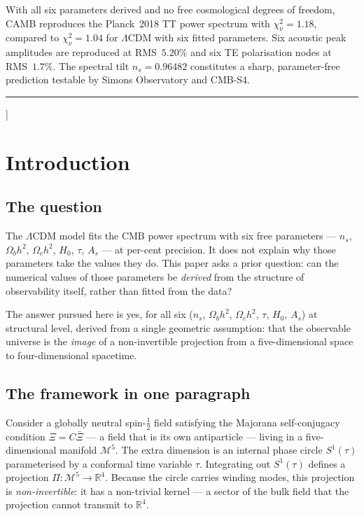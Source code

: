 \documentclass[twocolumn,10pt]{article}
\begin{document}
{With all six parameters derived and no free cosmological degrees of
freedom, CAMB reproduces the Planck~2018 TT power spectrum with
$\chi^2_\nu = 1.18$, compared to $\chi^2_\nu = 1.04$ for $\Lambda$CDM
with six fitted parameters.
Six acoustic peak amplitudes are reproduced at RMS~$5.20\%$ and
six TE polarisation nodes at RMS~$1.7\%$.
The spectral tilt $n_s = 0.96482$ constitutes a sharp, parameter-free
prediction testable by Simons Observatory and CMB-S4.

\vspace{5pt}\noindent\rule{\linewidth}{0.5pt}\vspace{8pt}
}]

\section{Introduction}
\label{sec:intro}

\subsection*{The question}

The $\Lambda$CDM model fits the CMB power spectrum with six free
parameters — $n_s$, $\Omega_bh^2$, $\Omega_ch^2$, $H_0$, $\tau$,
$A_s$ — at per-cent precision. It does not explain why those
parameters take the values they do. This paper asks a prior question:
can the numerical values of those parameters be \emph{derived} from
the structure of observability itself, rather than fitted from the
data?

The answer pursued here is yes, for all six ($n_s$,
$\Omega_bh^2$, $\Omega_ch^2$, $\tau$, $H_0$, $A_s$)
at structural level, derived from
a single geometric assumption: that the observable universe is the
\emph{image} of a non-invertible projection from a five-dimensional
space to four-dimensional spacetime.

\subsection*{The framework in one paragraph}

Consider a globally neutral spin-$\tfrac{1}{2}$ field satisfying
the Majorana self-conjugacy condition $\Xi = C\bar\Xi$ — a field
that is its own antiparticle — living in a five-dimensional manifold
$\mathcal{M}^5$. The extra dimension is an internal phase circle
$S^1(\tau)$ parameterised by a conformal time variable $\tau$.
Integrating out $S^1(\tau)$ defines a projection
$\Pi:\mathcal{M}^5\to\mathbb{R}^4$.
Because the circle carries winding modes, this projection is
\emph{non-invertible}: it has a non-trivial kernel — a sector of
the bulk field that the projection cannot transmit to
$\mathbb{R}^4$.
\end{document}
